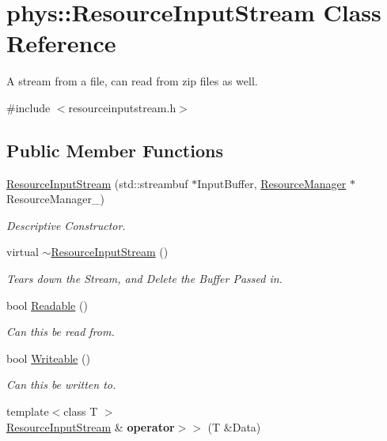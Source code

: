 \hypertarget{classphys_1_1ResourceInputStream}{
\section{phys::ResourceInputStream Class Reference}
\label{dc/d52/classphys_1_1ResourceInputStream}
}


A stream from a file, can read from zip files as well.  




{\ttfamily \#include $<$resourceinputstream.h$>$}

\subsection*{Public Member Functions}
\begin{DoxyCompactItemize}
\item 
\hyperlink{classphys_1_1ResourceInputStream_a890b739ac7f1c68108dc29f6887d2fa2}{ResourceInputStream} (std::streambuf $\ast$InputBuffer, \hyperlink{classphys_1_1ResourceManager}{ResourceManager} $\ast$ResourceManager\_\-)
\begin{DoxyCompactList}\small\item\em Descriptive Constructor. \item\end{DoxyCompactList}\item 
\hypertarget{classphys_1_1ResourceInputStream_a03b9d40f0b006edd6daf25e93084f80d}{
virtual \hyperlink{classphys_1_1ResourceInputStream_a03b9d40f0b006edd6daf25e93084f80d}{$\sim$ResourceInputStream} ()}
\label{dc/d52/classphys_1_1ResourceInputStream_a03b9d40f0b006edd6daf25e93084f80d}

\begin{DoxyCompactList}\small\item\em Tears down the Stream, and Delete the Buffer Passed in. \item\end{DoxyCompactList}\item 
bool \hyperlink{classphys_1_1ResourceInputStream_a4900f77dd452c2a2ddf47a76d36d85c3}{Readable} ()
\begin{DoxyCompactList}\small\item\em Can this be read from. \item\end{DoxyCompactList}\item 
bool \hyperlink{classphys_1_1ResourceInputStream_a6e7619bf3efd3b344fab92d326385009}{Writeable} ()
\begin{DoxyCompactList}\small\item\em Can this be written to. \item\end{DoxyCompactList}\item 
\hypertarget{classphys_1_1ResourceInputStream_a40a93720c3a4a9fb8c2c082c00574912}{
{\footnotesize template$<$class T $>$ }\\\hyperlink{classphys_1_1ResourceInputStream}{ResourceInputStream} \& {\bfseries operator$>$$>$} (T \&Data)}
\label{dc/d52/classphys_1_1ResourceInputStream_a40a93720c3a4a9fb8c2c082c00574912}


\end{DoxyCompactItemize}
